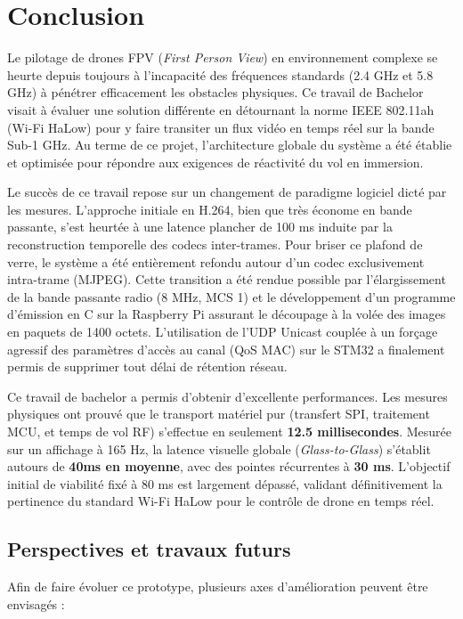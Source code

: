 \section{Conclusion}
Le pilotage de drones FPV (\textit{First Person View}) en environnement complexe se heurte depuis 
toujours à l'incapacité des fréquences standards (2.4 GHz et 5.8 GHz) à pénétrer efficacement les 
obstacles physiques. Ce travail de Bachelor visait à évaluer une solution différente en détournant 
la norme IEEE 802.11ah (Wi-Fi HaLow) pour y faire transiter un flux vidéo en temps réel sur la bande Sub-1 GHz. 
Au terme de ce projet, l'architecture globale du système a été établie et optimisée pour répondre aux exigences 
de réactivité du vol en immersion.\newline

Le succès de ce travail repose sur un changement de paradigme logiciel dicté par les mesures. 
L'approche initiale en H.264, bien que très économe en bande passante, s'est heurtée à une latence plancher 
de 100 ms induite par la reconstruction temporelle des codecs inter-trames. Pour briser ce plafond de verre, 
le système a été entièrement refondu autour d'un codec exclusivement intra-trame (MJPEG). Cette transition a 
été rendue possible par l'élargissement de la bande passante radio (8 MHz, MCS 1) et le développement d'un 
programme d'émission en C sur la Raspberry Pi assurant le découpage à la volée des images en paquets de 1400 octets. 
L'utilisation de l'UDP Unicast couplée à un forçage agressif des paramètres d'accès au canal (QoS MAC) sur le 
STM32 a finalement permis de supprimer tout délai de rétention réseau.\newline

Ce travail de bachelor a permis d'obtenir d'excellente performances. Les mesures physiques 
ont prouvé que le transport matériel pur (transfert SPI, traitement MCU, et temps de vol RF) s'effectue en 
seulement \textbf{12.5 millisecondes}. Mesurée sur un affichage à 165 Hz, la latence visuelle globale 
(\textit{Glass-to-Glass}) s'établit autours de \textbf{40ms en moyenne}, avec des pointes récurrentes à 
\textbf{30 ms}. L'objectif initial de viabilité fixé à 80 ms est largement dépassé, validant définitivement
la pertinence du standard Wi-Fi HaLow pour le contrôle de drone en temps réel.
\newpage
\subsection{Perspectives et travaux futurs}
Afin de faire évoluer ce prototype, plusieurs axes d'amélioration peuvent être envisagés :

